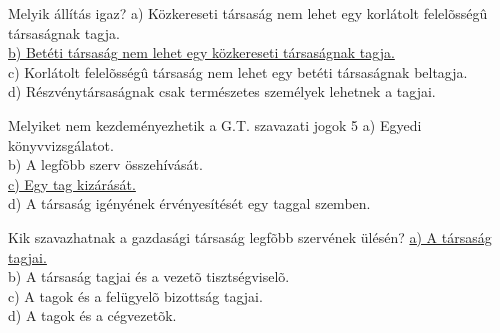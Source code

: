 \begin{frame}

\begin{tcolorbox}[title={70. Kérdés}]
Melyik állítás igaz?
\tcblower
a) Közkereseti társaság nem lehet egy korlátolt felelõsségû társaságnak tagja.\\
\uline {b) Betéti társaság nem lehet egy közkereseti társaságnak tagja.}\\
c) Korlátolt felelõsségû társaság nem lehet egy betéti társaságnak beltagja.\\
d) Részvénytársaságnak csak természetes személyek lehetnek a tagjai.
\end{tcolorbox}

\begin{tcolorbox}[title={71. Kérdés}]
Melyiket nem kezdeményezhetik a G.T. szavazati jogok 5%
\tcblower
a) Egyedi könyvvizsgálatot.\\
b) A legfõbb szerv összehívását.\\
\uline {c) Egy tag kizárását.}\\
d) A társaság igényének érvényesítését egy taggal szemben.
\end{tcolorbox}

\begin{tcolorbox}[title={72. Kérdés}]
Kik szavazhatnak a gazdasági társaság legfõbb szervének ülésén?
\tcblower
\uline {a) A társaság tagjai.}\\
b) A társaság tagjai és a vezetõ tisztségviselõ.\\
c) A tagok és a felügyelõ bizottság tagjai.\\
d) A tagok és a cégvezetõk.
\end{tcolorbox}

\end{frame}


